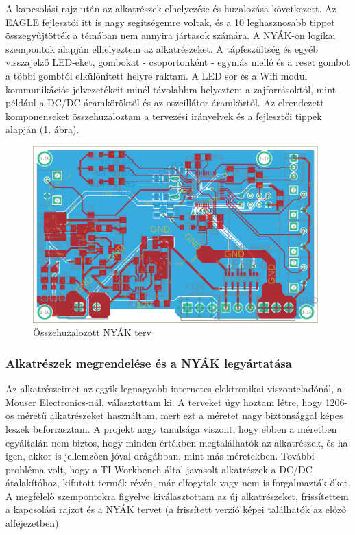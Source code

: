 \documentclass[../main.tex]{subfiles}
\begin{document}
            
            A kapcsolási rajz után az alkatrészek elhelyezése és huzalozása következett. Az EAGLE fejlesztői itt is nagy segítségemre voltak, és a 10 leghasznosabb tippet \cite{eagle_tips}
            összegyűjtötték a témában nem annyira jártasok számára.
            A NYÁK-on logikai szempontok alapján elhelyeztem az alkatrészeket. A tápfeszültség és egyéb visszajelző LED-eket, gombokat - csoportonként - egymás mellé és a reset gombot a többi gombtól elkülönített helyre raktam. A LED sor és a Wifi modul kommunikációs jelvezetékeit minél távolabbra helyeztem a zajforrásoktól, mint például a DC/DC áramköröktől és az oszcillátor áramkörtől. Az elrendezett komponenseket összehuzaloztam a tervezési irányelvek és a fejlesztői tippek alapján (\ref{fig:board_v02}. ábra). 
            
            \begin{figure}[h!]
                \centering
                    \includegraphics[width=11cm]{resources/pcb_res/board_v02.png}
                \caption{Összehuzalozott NYÁK terv}
                \label{fig:board_v02}
            \end{figure}
            
        \subsubsection{Alkatrészek megrendelése és a NYÁK legyártatása}
            
            Az alkatrészeimet az egyik legnagyobb internetes elektronikai viszonteladónál, a Mouser Electronics-nál, választottam ki. A terveket úgy hoztam létre, hogy 1206-os méretű alkatrészeket használtam, mert ezt a méretet nagy biztonsággal képes leszek beforrasztani. A projekt nagy tanulsága viszont, hogy ebben a méretben egyáltalán nem biztos, hogy minden értékben megtalálhatók az alkatrészek, és ha igen, akkor is jellemzően jóval drágábban, mint más méretekben. További probléma volt, hogy a TI Workbench által javasolt alkatrészek a DC/DC átalakítóhoz, kifutott termék révén, már elfogytak vagy nem is forgalmazták őket. A megfelelő szempontokra figyelve kiválasztottam az új alkatrészeket, frissítettem a kapcsolási rajzot és a NYÁK tervet (a frissített verzió képei találhatók az előző alfejezetben). 
            
\end{document}
